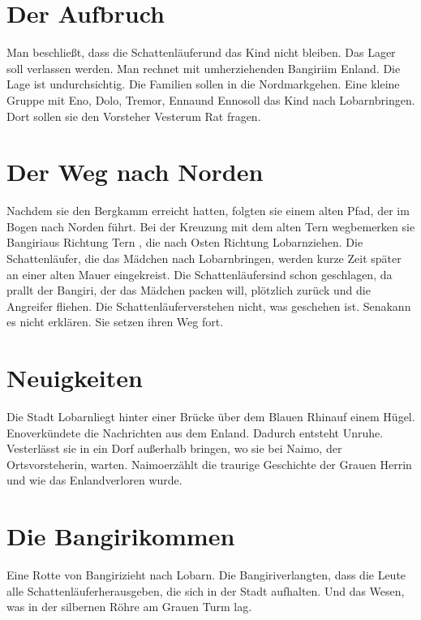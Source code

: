 \documentclass[12pt,a4paper,onecolumn,twoside,ngerman]{book}
\newcommand{\Tern}{Tern }
\newcommand{\Ternweg}{{\Tern}weg}
\newcommand{\Sena}{Sena}
\newcommand{\Bangiri}{Bangiri}
\newcommand{\Enland}{Enland}
\newcommand{\Schattenlaufer}{Schattenläufer}
\newcommand{\Eno}{Eno}
\newcommand{\Dolo}{Dolo}
\newcommand{\Enna}{Enna}
\newcommand{\Enno}{Enno}
\newcommand{\Tremor}{Tremor}
\newcommand{\Lobarn}{Lobarn}
\newcommand{\Vester}{Vester}
\newcommand{\Naimo}{Naimo}
\newcommand{\Nordmark}{Nordmark}
\newcommand{\Rhin}{Rhin}
\begin{document}
\section{Der Aufbruch}
Man beschließt, dass die \Schattenlaufer und das Kind nicht bleiben. Das Lager soll verlassen werden. Man rechnet mit umherziehenden \Bangiri im \Enland . Die Lage ist undurchsichtig. Die Familien sollen in die \Nordmark gehen. Eine kleine Gruppe mit \Eno , \Dolo , \Tremor , \Enna und \Enno soll das Kind nach \Lobarn bringen. Dort sollen sie den Vorsteher \Vester um Rat fragen.

\section{Der Weg nach Norden}
Nachdem sie den Bergkamm erreicht hatten, folgten sie einem alten Pfad, der im Bogen nach Norden führt. Bei der Kreuzung mit dem alten \Ternweg bemerken sie \Bangiri aus Richtung \Tern, die nach Osten Richtung \Lobarn ziehen. Die \Schattenlaufer, die das Mädchen nach \Lobarn bringen, werden kurze Zeit später an einer alten Mauer eingekreist. Die \Schattenlaufer sind schon geschlagen, da prallt der \Bangiri, der das Mädchen packen will, plötzlich zurück und die Angreifer fliehen. Die \Schattenlaufer verstehen nicht, was geschehen ist. \Sena kann es nicht erklären. Sie setzen ihren Weg fort.

\section{Neuigkeiten}
Die Stadt \Lobarn liegt hinter einer Brücke über dem Blauen \Rhin auf einem Hügel.
\Eno verkündete die Nachrichten aus dem \Enland. Dadurch entsteht Unruhe. \Vester lässt sie in ein Dorf außerhalb bringen, wo sie bei \Naimo, der Ortsvorsteherin, warten. \Naimo erzählt die traurige Geschichte der Grauen Herrin und wie das \Enland verloren wurde.

\section{Die \Bangiri kommen}
Eine Rotte von \Bangiri zieht nach \Lobarn. Die \Bangiri verlangten, dass die Leute alle \Schattenlaufer herausgeben, die sich in der Stadt aufhalten. Und das Wesen, was in der silbernen Röhre am Grauen Turm lag.
\end{document}
